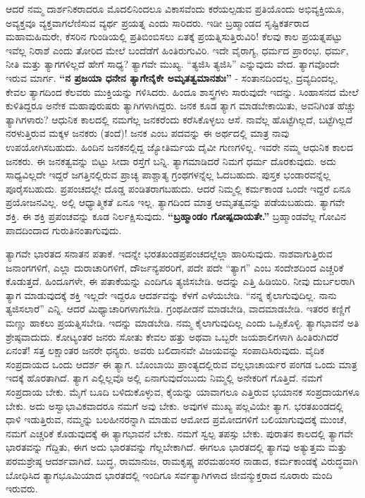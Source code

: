 ಆದರೆ ನಮ್ಮ ದಾರ್ಶನಿಕರಾದರೂ ಮೊದಲಿನಿಂದಲೂ ವಿಕಾಸವೆಂದು ಕರೆಯಲ್ಪಡುವ ಪ್ರತಿಯೊಂದು ಅಭಿವ್ಯಕ್ತಿಯೂ, ಅವ್ಯಕ್ತವೂ ವ್ಯಕ್ತವಾಗಲೆಣಿಸುವ ವ್ಯರ್ಥ ಪ್ರಯತ್ನ ಎಂದು ಸಾರಿದರು. ಇಡೀ ಬ್ರಹ್ಮಾಂಡದ ಸೃಷ್ಟಿಕರ್ತರಾದ ಮಹಾಮಹಿಮರೇ, ಕೆಸರಿನ ಗುಂಡಿಯಲ್ಲಿ ಪ್ರತಿಬಿಂಬಿಸಲು ಏತಕ್ಕೆ ಪ್ರಯತ್ನಿಸುತ್ತಿರುವಿರಿ! ಕೆಲವು ಕಾಲ ಪ್ರಯತ್ನಪಟ್ಟು ಇವೆಲ್ಲ ನಿರಾಶೆ ಎಂದು ತೋರಿದ ಮೇಲೆ ಬಂದೆಡೆಗೆ ಹಿಂತಿರುಗುವಿರಿ. ಇದೇ ವೈರಾಗ್ಯ, ಧರ್ಮದ ಪ್ರಾರಂಭ. ಧರ್ಮ, ನೀತಿ ಮತ್ತು ತ್ಯಾಗಗಳಿಲ್ಲದೆ ಹೇಗೆ ಸಾಧ್ಯ? ತ್ಯಾಗವೇ ಮುಖ್ಯ. “ತ್ಯಜಿಸಿ ತ್ಯಜಿಸಿ” ಎನ್ನುವುದು ವೇದ. ತ್ಯಾಗವೊಂದೇ ಇರುವ ಮಾರ್ಗ. \textbf{“ನ ಪ್ರಜಯಾ ಧನೇನ ತ್ಯಾಗೇನೈಕೇ ಅಮೃತತ್ವಮಾನಶುಃ”} - ಸಂತಾನದಿಂದಲ್ಲ, ದ್ರವ್ಯದಿಂದಲ್ಲ, ಕೇವಲ ತ್ಯಾಗದಿಂದ ಕೆಲವರು ಮುಕ್ತಿಯನ್ನು ಗಳಿಸಿದರು. ಹಿಂದೂ ಶಾಸ್ತ್ರಗಳು ಸಾರುವುದೇ ಇದನ್ನು. ಸಿಂಹಾಸನದ ಮೇಲೆ ಕುಳಿತಿದ್ದರೂ ಅನೇಕ ಮಹಾಪುರುಷರು ತ್ಯಾಗಿಗಳಾಗಿದ್ದರು. ಜನಕ ಕೂಡ ತ್ಯಾಗ ಮಾಡಬೇಕಾಯಿತು, ಅವನಿಗಿಂತ ಹೆಚ್ಚು ತ್ಯಾಗಿಗಳಾರು? ಆಧುನಿಕ ಕಾಲದಲ್ಲಿ ನಮಗೆಲ್ಲ ಜನಕರೆಂದು ಕರೆಸಿಕೊಳ್ಳಲು ಆಸೆ. ನಾವೆಲ್ಲ ಹೊಟ್ಟೆಗಿಲ್ಲದೆ, ಬಟ್ಟೆಗಿಲ್ಲದೆ ನರಳುತ್ತಿರುವ ಮಕ್ಕಳ ಜನಕರು (ತಂದೆ)! ಜನಕ ಎಂಬ ಪದವನ್ನು ಈ ಅರ್ಥದಲ್ಲಿ ಮಾತ್ರ ನಾವು ಉಪಯೋಗಿಸಬಹುದು. ಹಿಂದಿನ ಜನಕನಲ್ಲಿದ್ದ ಜ್ಯೋತಿರ್ಮಯ ದೈವೀ ಗುಣಗಳಿಲ್ಲ. ಇವರೇ ನಮ್ಮ ಆಧುನಿಕ ಕಾಲದ ಜನಕರು. ಈ ಜನಕತ್ವವನ್ನು ಬಿಟ್ಟು ಸೀದಾ ರಸ್ತೆಗೆ ಬನ್ನಿ. ತ್ಯಾಗಮಾಡಿದರೆ ನಿಮಗೆ ಧರ್ಮ ದೊರಕುವುದು. ಅದು ಸಾಧ್ಯವಿಲ್ಲದೇ ಇದ್ದರೆ ಜಗತ್ತಿನಲ್ಲಿರುವ ಪ್ರಾಚ್ಯ ಪಾಶ್ಚಾತ್ಯ ಗ್ರಂಥಗಳನ್ನೆಲ್ಲ ಓದಬಹುದು. ಪುಸ್ತಕ ಭಂಡಾರವನ್ನೆಲ್ಲ ಪೂರೈಸಬಹುದು. ಪ್ರಪಂಚದಲ್ಲೇ ದೊಡ್ಡ ಪಂಡಿತರಾಗಬಹುದು. ಆದರೆ ನಿಮ್ಮಲ್ಲಿ ಕರ್ಮಕಾಂಡ ಒಂದೇ ಇದ್ದರೆ ಏನೂ ಪ್ರಯೋಜನವಿಲ್ಲ. ಅಲ್ಲಿ ಆಧ್ಯಾತ್ಮಿಕತೆ ಏನೂ ಇಲ್ಲ. ತ್ಯಾಗದಿಂದ ಮಾತ್ರ ಆಮೃತತ್ವವನ್ನು ಪಡೆಯಬಹುದು. ತ್ಯಾಗವೇ ಶಕ್ತಿ. ಈ ಶಕ್ತಿ ಪ್ರಪಂಚವನ್ನು ಕೂಡ ನಿರ್ಲಕ್ಷಿಸುವುದು. \textbf{“ಬ್ರಹ್ಮಾಂಡಂ ಗೋಷ್ಪದಾಯತೇ.”} ಬ್ರಹ್ಮಾಂಡವೆಲ್ಲ ಗೋವಿನ ಪಾದದಿಂದಾದ ಗುರುತಿನಂತಾಗುವುದು.

ತ್ಯಾಗವೇ ಭಾರತದ ಸನಾತನ ಪತಾಕೆ. ಇದನ್ನೇ ಭರತಖಂಡಪ್ರಪಂಚದಲ್ಲೆಲ್ಲಾ ಹಾರಿಸುವುದು. ನಾಶವಾಗುತ್ತಿರುವ ಜನಾಂಗಗಳಿಗೆ, ಎಲ್ಲಾ ದುರಾಚಾರಿಗಳಿಗೆ, ದೌರ್ಜನ್ಯಪರರಿಗೆ, ಪದೇ ಪದೇ “ತ್ಯಾಗ” ಎಂಬ ಸಂದೇಶದಿಂದ ಎಚ್ಚರಿಕೆ ಕೊಡುತ್ತದೆ. ಹಿಂದೂಗಳೇ, ಈ ಪತಾಕೆಯನ್ನು ಎಂದಿಗೂ ತ್ಯಜಿಸಬೇಡಿ. ಅದನ್ನು ಎತ್ತಿ ಹಿಡಿಯಿರಿ. ನೀವು ದುರ್ಬಲರಾಗಿ ತ್ಯಾಗ ಮಾಡುವುದಕ್ಕೆ ಶಕ್ತಿ ಇಲ್ಲದೇ ಇದ್ದರೂ ಆದರ್ಶವನ್ನು ಕೆಳಗೆ ಎಳೆಯಬೇಡಿ. “ನನ್ನ ಕೈಲಾಗುವುದಿಲ್ಲ. ನಾನು ತ್ಯಜಿಸಲಾರೆ” ಎನ್ನಿ. ಆದರೆ ಮಿಥ್ಯಾಚಾರಿಗಳಾಗಬೇಡಿ. ಗ್ರಂಥಪೀಡನೆ ಮಾಡಬೇಡಿ, ವಾದಮಾಡಬೇಡಿ. ಇತರರ ಕಣ್ಣಿಗೆ ಮಣ್ಣು ಹಾಕಲು ಪ್ರಯತ್ನಿಸಬೇಡಿ. ಇದನ್ನು ಮಾಡಬೇಡಿ. ನಮ್ಮ ಕೈಲಾಗುವುದಿಲ್ಲ ಎಂದು ಒಪ್ಪಿಕೊಳ್ಳಿ. ತ್ಯಾಗಭಾವನೆ ಅತಿ ಶ್ರೇಷ್ಠವಾದುದು. ಕೋಟ್ಯಂತರ ಜನರು ಸೋತು ಕೇವಲ ಹತ್ತು ಅಥವಾ ಒಬ್ಬರೇ ಜಯಶಾಲಿಗಳಾಗಿ ಹಿಂತಿರುಗಿದರೆ ಏನಂತೆ! ಸತ್ತ ಲಕ್ಷಾಂತರ ಜನರೇ ಧನ್ಯರು. ಅವರು ಬಲಿದಾನವೇ ವಿಜಯವನ್ನು ಸಂಪಾದಿಸಿರುವುದು. ವೈದಿಕ ಸಂಪ್ರದಾಯದ ಒಂದು ಆದರ್ಶ ಈ ತ್ಯಾಗ. ಬೊಂಬಾಯಿ ಪ್ರಾಂತ್ಯದಲ್ಲಿರುವ ವಲ್ಲಭಾಚಾರ್ಯರ ಪಂಗಡ ಒಂದು ಮಾತ್ರ ಇದಕ್ಕೆ ಹೊರತಾಗಿದೆ. ತ್ಯಾಗ ಎಲ್ಲಿಲ್ಲವೊ ಅಲ್ಲಿ ಏನಾಗುವುದೆಂಬುದು ನಿಮ್ಮಲ್ಲಿ ಅನೇಕರಿಗೆ ಗೊತ್ತಿದೆ. ನಮಗೆ ಸಂಪ್ರದಾಯ ಬೇಕು. ಮೈಗೆ ಬೂದಿ ಬಳಿದುಕೊಳ್ಳುವ, ಕೈಯನ್ನು ಯಾವಾಗಲೂ ಎತ್ತಿರುವ ಭಯಾನಕ ಸಂಪ್ರದಾಯಗಳೂ ಬೇಕು. ಅದು ಅಸ್ವಾಭಾವಿಕವಾದರೂ ನಮಗೆ ಅವು ಬೇಕು. ಅವುಗಳ ಮುಖ್ಯ ಪಲ್ಲವಿಯೇ ತ್ಯಾಗ. ಭರತಖಂಡದಲ್ಲಿ ಧಾಳಿ ಇಡುತ್ತಿರುವ, ನಮ್ಮನ್ನು ಬಲಹೀನರನ್ನಾಗಿ ಮಾಡುವ ಆಮೋದ ಪ್ರಮೋದಗಳಿಗೆ ಬಲಿಯಾಗುವುದಕ್ಕೆ ಮುಂಚೆ, ನಮಗೆ ಎಚ್ಚರಿಕೆ ಕೊಡುವುದಕ್ಕೆ ಈ ತ್ಯಾಗಭಾವನೆ ಬೇಕು. ನಮಗೆ ಸ್ವಲ್ಪ ತಪಸ್ಸು ಬೇಕು. ಪುರಾತನ ಕಾಲದಲ್ಲಿ ತ್ಯಾಗವೇ ಭಾರತವನ್ನು ಗೆದ್ದಿತು, ಈಗ ಅದು ಭಾರತವನ್ನು ಗೆಲ್ಲಬೇಕಾಗಿದೆ. ಈಗಲೂ ಭಾರತದಲ್ಲಿ ತ್ಯಾಗವು ಅತ್ಯುತ್ತಮ ಮತ್ತು ಪರಮಶ್ರೇಷ್ಠ ಆದರ್ಶವಾಗಿದೆ. ಬುದ್ಧ, ರಾಮಾನುಜ, ರಾಮಕೃಷ್ಣ ಪರಮಹಂಸರ ನಾಡಾದ, ಕರ್ಮಕಾಂಡಕ್ಕೆ ವಿರುದ್ಧವಾಗಿ ಬೋಧಿಸಿದ ತ್ಯಾಗಭೂಮಿಯಾದ ಭಾರತದಲ್ಲಿ ಇಂದಿಗೂ ಸರ್ವತ್ಯಾಗಿಗಳಾದ ಜೀವನ್ಮುಕ್ತರಾದ ನೂರಾರು ಮಂದಿ ಇರುವರು.


